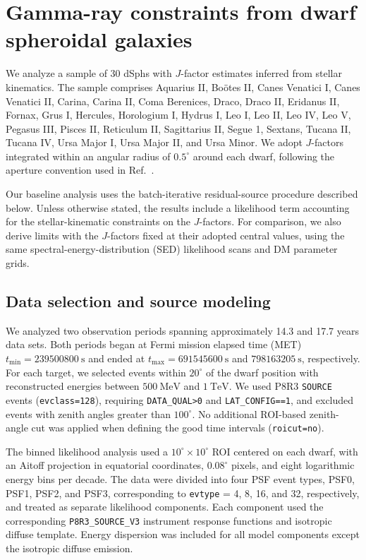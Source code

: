 \documentclass[superscriptaddress,
showpacs,preprintnumbers,nofootinbib,eqsecnum,amsmath,amssymb,aps,11pt, groupedaddress, floatfix]{revtex4-2}
\begin{document}
\section{Gamma-ray constraints from dwarf spheroidal galaxies}
\label{sec:dsph-gamma-analysis}

We analyze a sample of 30 dSphs with $J$-factor estimates inferred from stellar kinematics.
The sample comprises Aquarius II, Bo{\"o}tes II, Canes Venatici I, Canes Venatici II, Carina, Carina II, Coma Berenices, Draco, Draco II, Eridanus II, Fornax, Grus I, Hercules, Horologium I, Hydrus I, Leo I, Leo II, Leo IV, Leo V, Pegasus III, Pisces II, Reticulum II, Sagittarius II, Segue 1, Sextans, Tucana II, Tucana IV, Ursa Major I, Ursa Major II, and Ursa Minor.
We adopt $J$-factors integrated within an angular radius of $0.5^\circ$ around each dwarf, following the aperture convention used in Ref.~\cite{Fermi-LAT:2015att}.

Our baseline analysis uses the batch-iterative residual-source procedure described below.
Unless otherwise stated, the results include a likelihood term accounting for the stellar-kinematic constraints on the $J$-factors.
For comparison, we also derive limits with the $J$-factors fixed at their adopted central values, using the same spectral-energy-distribution (SED) likelihood scans and DM parameter grids.


\subsection{Data selection and source modeling}
\label{subsec:data-selection}


We analyzed two observation periods spanning approximately 14.3 and 17.7 years data sets. Both periods began at Fermi mission elapsed time (MET) $t_{\min}=239500800~\mathrm{s}$ and ended at $t_{\max}=691545600~\mathrm{s}$ and $798163205~\mathrm{s}$, respectively. 
For each target, we selected events within $20^\circ$ of the dwarf position with reconstructed energies between $500~\mathrm{MeV}$ and $1~\mathrm{TeV}$. We used P8R3 \texttt{SOURCE} events (\texttt{evclass=128}), requiring \texttt{DATA\_QUAL>0} and \texttt{LAT\_CONFIG==1}, and excluded events with zenith angles greater than $100^\circ$. No additional ROI-based zenith-angle cut was applied when defining the good time intervals (\texttt{roicut=no}).

The binned likelihood analysis used a $10^\circ\times10^\circ$ ROI centered on each dwarf, with an Aitoff projection in equatorial coordinates, $0.08^\circ$ pixels, and eight logarithmic energy bins per decade. The data were divided into four PSF event types, PSF0, PSF1, PSF2, and PSF3, corresponding to \texttt{evtype} = 4, 8, 16, and 32, respectively, and treated as separate likelihood components. Each component used the corresponding \texttt{P8R3\_SOURCE\_V3} instrument response functions and isotropic diffuse template. Energy dispersion was included for all model components except the isotropic diffuse emission.
\end{document}
